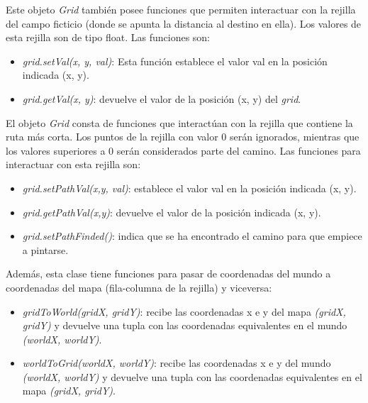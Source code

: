 Este objeto \textit{Grid} también posee funciones que permiten interactuar con la rejilla del campo ficticio (donde se apunta la distancia al destino en ella). Los valores de esta rejilla son de tipo float.  Las funciones son:

\begin{itemize}
\item	\textit{grid.setVal(x, y, val)}: Esta función establece el valor val en la posición indicada (x, y).
\item	\textit{grid.getVal(x, y)}: devuelve el valor de la posición (x, y) del \textit{grid}.
\end{itemize}

El objeto \textit{Grid} consta de funciones que interactúan con la rejilla que contiene la ruta más corta. Los puntos de la rejilla con valor 0 serán ignorados, mientras que los valores superiores a 0 serán considerados parte del camino. Las funciones para interactuar con esta rejilla son:

\begin{itemize}
\item\textit{ grid.setPathVal(x,y, val)}: establece el valor val en la posición indicada (x, y).
\item	\textit{grid.getPathVal(x,y)}: devuelve el valor de la posición indicada (x, y).
\item \textit{grid.setPathFinded()}: indica que se ha encontrado el camino para que empiece a pintarse.
\end{itemize}

Además, esta clase tiene funciones para pasar de coordenadas del mundo a coordenadas del mapa (fila-columna de la rejilla) y viceversa:

\begin{itemize}
\item \textit{gridToWorld(gridX, gridY)}: recibe las coordenadas x e y del mapa \textit{(gridX, gridY)} y devuelve una tupla con las coordenadas equivalentes en el mundo \textit{(worldX, worldY)}.
\item \textit{worldToGrid(worldX, worldY)}: recibe las coordenadas x e y del mundo \textit{(worldX, worldY)} y devuelve una tupla con las coordenadas equivalentes en el mapa \textit{(gridX, gridY)}.

\end{itemize}

